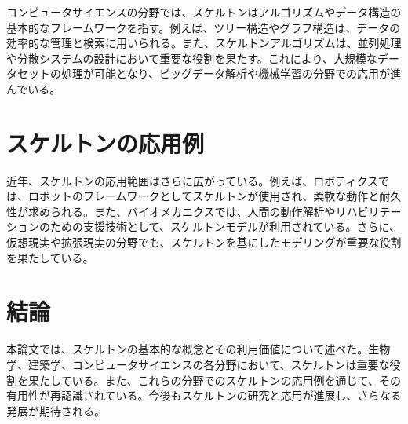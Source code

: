 \documentclass[article]{jlreq}
\begin{document}
コンピュータサイエンスの分野では、スケルトンはアルゴリズムやデータ構造の基本的なフレームワークを指す。例えば、ツリー構造やグラフ構造は、データの効率的な管理と検索に用いられる。また、スケルトンアルゴリズムは、並列処理や分散システムの設計において重要な役割を果たす。これにより、大規模なデータセットの処理が可能となり、ビッグデータ解析や機械学習の分野での応用が進んでいる。

\section{スケルトンの応用例}

近年、スケルトンの応用範囲はさらに広がっている。例えば、ロボティクスでは、ロボットのフレームワークとしてスケルトンが使用され、柔軟な動作と耐久性が求められる。また、バイオメカニクスでは、人間の動作解析やリハビリテーションのための支援技術として、スケルトンモデルが利用されている。さらに、仮想現実や拡張現実の分野でも、スケルトンを基にしたモデリングが重要な役割を果たしている。

\section{結論}

本論文では、スケルトンの基本的な概念とその利用価値について述べた。生物学、建築学、コンピュータサイエンスの各分野において、スケルトンは重要な役割を果たしている。また、これらの分野でのスケルトンの応用例を通じて、その有用性が再認識されている。今後もスケルトンの研究と応用が進展し、さらなる発展が期待される。

\printbibliography[title=引用文献]{}
\end{document}
